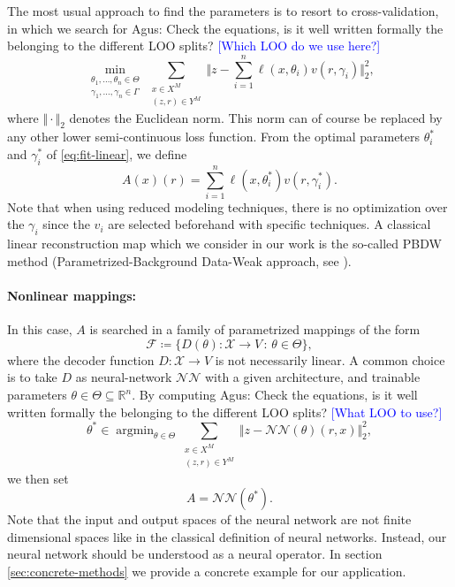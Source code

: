 \documentclass[11pt,a4paper,twoside]{article}
\theoremstyle{definition}
\numberwithin{equation}{section}
\newcommand{\cF}{\ensuremath{\mathcal{F}}}
\newcommand{\cN}{\ensuremath{\mathcal{N}}}
\newcommand{\cX}{\ensuremath{\mathcal{X}}}
\newcommand{\bR}{\ensuremath{\mathbb{R}}}
\newcommand{\<}{\langle}
\renewcommand{\>}{\rangle}
\newcommand{\argmin}{\operatorname{argmin}}
\newcommand{\cond}{\ensuremath{\,:\,}}
\newcommand{\ascomment}[1]{{\color{teal} Agus: #1}}
\newcommand{\om}[1]{\textcolor{blue}{#1}}
\begin{document}
The most usual approach to find the parameters is to resort to cross-validation, in which we search for
\ascomment{Check the equations, is it well written formally the belonging to the different LOO splits?} \om{[Which LOO do we use here?]}
\begin{equation}
\label{eq:fit-linear}
\min_{ \substack{\theta_1,\dots, \theta_n \in \Theta \\ \gamma_1,\dots, \gamma_n \in \Gamma}}
\sum_{ \substack{x\in X^{M} \\ (z, r)\in Y^{M}}}
\Vert z - \sum_{i=1}^n \ell(x, \theta_i) v(r, \gamma_i) \Vert^2_2,
\end{equation}
where $\Vert \cdot \Vert_2$ denotes the Euclidean norm. This norm can of course be replaced by any other lower semi-continuous loss function. From the optimal parameters $\theta_i^*$ and $\gamma_i^*$ of \eqref{eq:fit-linear}, we define
$$
A(x)(r) = \sum_{i=1}^n \ell(x, \theta_i^*) v(r, \gamma^*_i).
$$
Note that when using reduced modeling techniques, there is no optimization over the $\gamma_i$ since the $v_i$ are selected beforehand with specific techniques. A classical linear reconstruction map which we consider in our work is the so-called PBDW method (Parametrized-Background Data-Weak approach, see \cite{MPPY2015, BCDDPW2017, Mula2023}).

\paragraph{Nonlinear mappings:} In this case, $A$ is searched in a family of parametrized mappings of the form
$$
\cF \coloneqq \{ D(\theta): \cX \to V   \cond \theta \in \Theta  \},
$$
where the decoder function $D:\cX\to V$ is not necessarily linear. A common choice is to take $D$ as neural-network $\cN\cN$ with a given architecture, and trainable parameters $\theta \in \Theta\subseteq \bR^n$. By computing
\ascomment{Check the equations, is it well written formally the belonging to the different LOO splits?} \om{[What LOO to use?]}
$$
\theta^* \in \argmin_{\theta \in \Theta}
\sum_{\substack{x\in X^{M} \\ (z, r)\in Y^{M}}}
\Vert z - \cN\cN(\theta)(r, x) \Vert^2_2,
$$
we then set
$$
A = \cN\cN(\theta^*).
$$
Note that the input and output spaces of the neural network are not finite dimensional spaces like in the classical definition of neural networks. Instead, our neural network should be understood as a neural operator. In section \ref{sec:concrete-methods} we provide a concrete example for our application.
\end{document}
